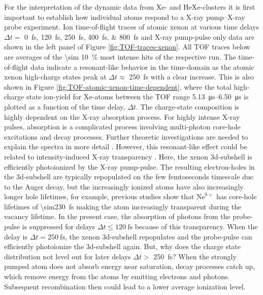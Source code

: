 For the interpretation of the dynamic data from Xe- and HeXe-clusters it is first important to establish how individual atoms respond to a X-ray pump--X-ray probe experiment. Ion time-of-flight traces of atomic xenon at various time delays $\Delta t =$ \SIlist{0;120;250;400;800}{\femto\second} and X-ray pump-pulse only data are shown in the left panel of Figure \ref{fig:TOF-traces-xenon}. All TOF traces below are averages of the \SI{\sim 10}{\percent} most intense hits of the respective run. The time-of-flight data indicate a resonant-like behavior in the time-domain as the atomic xenon high-charge states peak at $\Delta t\approx$ \SI{250}{\femto\second} with a clear increase. This is also shown in Figure \ref{fig:TOF-atomic-xenon-time-dependent}, where the total high-charge state ion-yield for Xe-atoms between the TOF range \SIrange{5.13}{6.50}{\micro\second} is plotted as a function of the time delay, $\Delta t$. The charge-state composition is highly dependent on the X-ray absorption process. For highly intense X-ray pulses, absorption is a complicated process involving multi-photon core-hole excitations and decay processes. Further theoretic investigations are needed to explain the spectra in more detail \cite{Ho-2014-PRL,Ho-2016-PC}. However, this resonant-like effect could be related to intensity-induced X-ray transparency \citep{Young-2010-Nature,Schorb-2012-PRL}. Here, the xenon 3d-subshell is efficiently photoionized by the X-ray pump-pulse. The resulting electron-holes in the 3d-subshell are typically repopulated on the few femtoseconds timescale due to the Auger decay, but the increasingly ionized atoms have also increasingly longer hole lifetimes, for example, previous studies show that $\text{Ne}^{8+}$ has core-hole lifetimes of \SI{\sim230}{\femto\second} \cite{Young-2010-Nature} making the atom increasingly transparent during the vacancy lifetime. In the present case, the absorption of photons from the probe-pulse is suppressed for delays $\Delta t \leq \SI{120}{\femto\second}$ because of this transparency. When the delay is $\Delta t = \SI{250}{\femto\second}$, the xenon 3d-subshell repopulates and the probe-pulse can efficiently photoionize the 3d-subshell again. But, why does the charge state distribution not level out for later delays $\Delta t >$ \SI{250}{\femto\second}? When the strongly pumped atom does not absorb energy near saturation, decay processes catch up, which remove energy from the atoms by emitting electrons and photons. Subsequent recombination then could lead to a lower average ionization level.\\[1\baselineskip]
